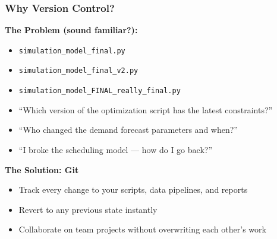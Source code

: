 \documentclass{beamer}
\begin{document}
\begin{frame}
\frametitle{Why Version Control?}
\textbf{The Problem (sound familiar?):}
\begin{itemize}
    \item \texttt{simulation\_model\_final.py}
    \item \texttt{simulation\_model\_final\_v2.py}
    \item \texttt{simulation\_model\_FINAL\_really\_final.py}
    \item ``Which version of the optimization script has the latest constraints?''
    \item ``Who changed the demand forecast parameters and when?''
    \item ``I broke the scheduling model --- how do I go back?''
\end{itemize}
\vspace{4mm}
\textbf{The Solution: Git}
\begin{itemize}
    \item Track every change to your scripts, data pipelines, and reports
    \item Revert to any previous state instantly
    \item Collaborate on team projects without overwriting each other's work
\end{itemize}
\end{frame}

\end{document}
